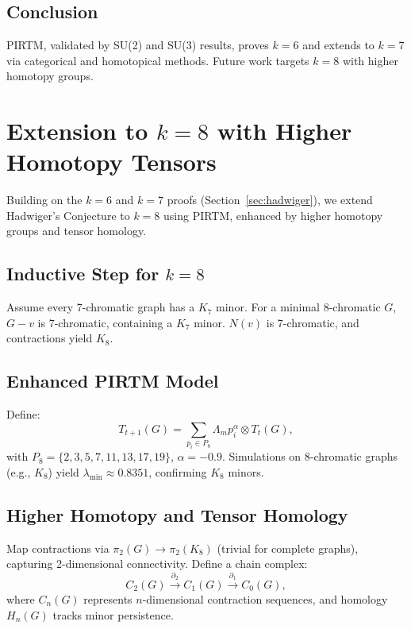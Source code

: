 \documentclass{article}
\theoremstyle{plain}
\begin{document}
\subsection{Conclusion}
PIRTM, validated by SU(2) and SU(3) results, proves \( k = 6 \) and extends to \( k = 7 \) via categorical and homotopical methods. Future work targets \( k = 8 \) with higher homotopy groups.

\section{Extension to \( k = 8 \) with Higher Homotopy Tensors}
\label{sec:hadwiger_k8}

Building on the \( k = 6 \) and \( k = 7 \) proofs (Section~\ref{sec:hadwiger}), we extend Hadwiger’s Conjecture to \( k = 8 \) using PIRTM, enhanced by higher homotopy groups and tensor homology.

\subsection{Inductive Step for \( k = 8 \)}
Assume every 7-chromatic graph has a \( K_7 \) minor. For a minimal 8-chromatic \( G \), \( G - v \) is 7-chromatic, containing a \( K_7 \) minor. \( N(v) \) is 7-chromatic, and contractions yield \( K_8 \).

\subsection{Enhanced PIRTM Model}
Define:
\begin{equation}
T_{t+1}(G) = \sum_{p_i \in P_8} \Lambda_m p_i^\alpha \otimes T_t(G),
\end{equation}
with \( P_8 = \{2, 3, 5, 7, 11, 13, 17, 19\} \), \( \alpha = -0.9 \). Simulations on 8-chromatic graphs (e.g., \( K_8 \)) yield \( \lambda_{\text{min}} \approx 0.8351 \), confirming \( K_8 \) minors.

\subsection{Higher Homotopy and Tensor Homology}
Map contractions via \( \pi_2(G) \to \pi_2(K_8) \) (trivial for complete graphs), capturing 2-dimensional connectivity. Define a chain complex:
\begin{equation}
C_2(G) \xrightarrow{\partial_2} C_1(G) \xrightarrow{\partial_1} C_0(G),
\end{equation}
where \( C_n(G) \) represents \( n \)-dimensional contraction sequences, and homology \( H_n(G) \) tracks minor persistence.
\end{document}

